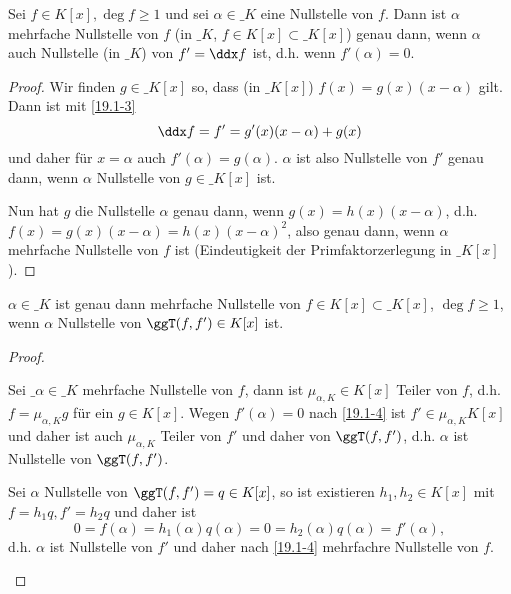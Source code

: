 \begin{lem} \label{19.1-4}
	Sei $f \in K[x], \deg f \ge 1$ und sei $\alpha \in \_K$ eine Nullstelle von $f$.
	Dann ist $\alpha$ mehrfache Nullstelle von $f$ (in $\_K$, $f \in K[x] \subset \_K[x]$) genau dann, wenn $\alpha$ auch Nullstelle (in $\_K$) von $f' = \ddx f$ ist, d.h. wenn $f'(\alpha) = 0$.
	\begin{proof}
		Wir finden $g \in \_K[x]$ so, dass (in $\_K[x]$) $f(x) = g(x) (x - \alpha)$ gilt.
		Dann ist mit \ref{19.1-3}
		\[
			\ddx f = f' = g'(x)(x-\alpha) + g(x)
		\]
		und daher für $x = \alpha$ auch $f'(\alpha) = g(\alpha)$.
		$\alpha$ ist also Nullstelle von $f'$ genau dann, wenn $\alpha$ Nullstelle von $g \in \_K[x]$ ist.

		Nun hat $g$ die Nullstelle $\alpha$ genau dann, wenn $g(x) = h(x)(x-\alpha)$, d.h. $f(x) = g(x)(x-\alpha) = h(x) (x-\alpha)^2$, also genau dann, wenn $\alpha$ mehrfache Nullstelle von $f$ ist (Eindeutigkeit der Primfaktorzerlegung in $\_K[x]$).
	\end{proof}
\end{lem}

\begin{kor} \label{19.1-5}
	$\alpha \in \_K$ ist genau dann mehrfache Nullstelle von $f \in K[x] \subset \_K[x]$, $\deg f \ge 1$, wenn $\alpha$ Nullstelle von $\ggT(f, f') \in K[x]$ ist.
	\begin{proof}
		\begin{segnb}{\ProofImplication}
			Sei $\_{\alpha} \in \_{K}$ mehrfache Nullstelle von $f$, dann ist $\mu_{\alpha,K} \in K[x]$ Teiler von $f$, d.h. $f = \mu_{\alpha, K} g$ für ein $g \in K[x]$.
			Wegen $f'(\alpha) = 0$ nach \ref{19.1-4} ist $f' \in \mu_{\alpha, K} K[x]$ und daher ist auch $\mu_{\alpha, K}$ Teiler von $f'$ und daher von $\ggT(f, f')$, d.h. $\alpha$ ist Nullstelle von $\ggT(f, f')$.
		\end{segnb}
		\begin{segnb}{\ProofImplication*}
			Sei $\alpha$ Nullstelle von $\ggT(f, f') = q \in K[x]$, so ist existieren $h_1, h_2 \in K[x]$ mit $f = h_1 q, f' = h_2 q$ und daher ist
			\[
				0 = f(\alpha) = h_1(\alpha) q(\alpha)
				= 0 = h_2(\alpha) q(\alpha)
				= f'(\alpha),
			\]
			d.h. $\alpha$ ist Nullstelle von $f'$ und daher nach \ref{19.1-4} mehrfachre Nullstelle von $f$.
		\end{segnb}
	\end{proof}
\end{kor}

